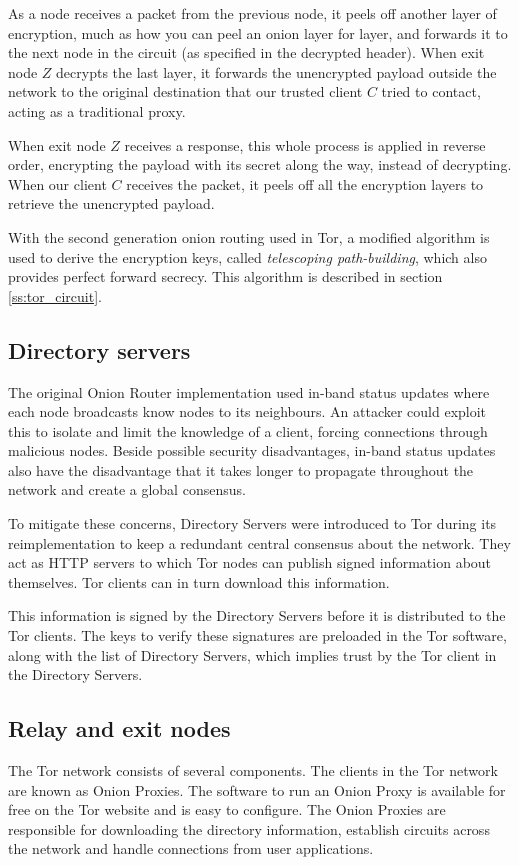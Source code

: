 \documentclass[journal]{IEEEtran}
\begin{document}
		As a node receives a packet from the previous node, it peels off another layer of encryption, much as how you can peel an onion layer for layer, and forwards it to the next node in the circuit (as specified in the decrypted header). When exit node $Z$ decrypts the last layer, it forwards the unencrypted payload outside the network to the original destination that our trusted client $C$ tried to contact, acting as a traditional proxy.
					
		When exit node $Z$ receives a response, this whole process is applied in reverse order, encrypting the payload with its secret along the way, instead of decrypting. When our client $C$ receives the packet, it peels off all the encryption layers to retrieve the unencrypted payload.
		
		With the second generation onion routing used in Tor, a modified algorithm is used to derive the encryption keys, called \emph{telescoping path-building}, which also provides perfect forward secrecy. This algorithm is described in section \ref{ss:tor_circuit}.
				
	\subsection{Directory servers}
		The original Onion Router implementation used in-band status updates where each node broadcasts know nodes to its neighbours. An attacker could exploit this to isolate and limit the knowledge of a client, forcing connections through malicious nodes. Beside possible security disadvantages, in-band status updates also have the disadvantage that it takes longer to propagate throughout the network and create a global consensus.
					
		To mitigate these concerns, Directory Servers were introduced to Tor during its reimplementation to keep a redundant central consensus about the network. They act as HTTP servers to which Tor nodes can publish signed information about themselves. Tor clients can in turn download this information.
					
		This information is signed by the Directory Servers before it is distributed to the Tor clients. The keys to verify these signatures are preloaded in the Tor software, along with the list of Directory Servers, which implies trust by the Tor client in the Directory Servers.

	\subsection{Relay and exit nodes}
		The Tor network consists of several components. The clients in the Tor network are known as Onion Proxies. The software to run an Onion Proxy is available for free on the Tor website \cite{torprojectwebsite} and is easy to configure. The Onion Proxies are responsible for downloading the directory information, establish circuits across the network and handle connections from user applications.
		
\end{document}
